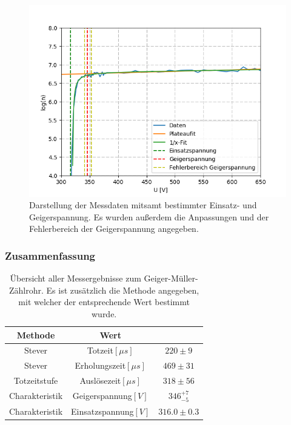 \documentclass[12pt,a4paper]{article}
\begin{document}
\begin{figure}
\centering
\includegraphics[scale=1]{Bilder/GMlog.PNG}
\caption{Darstellung der Messdaten mitsamt bestimmter Einsatz- und Geigerspannung. Es wurden außerdem die Anpassungen und der Fehlerbereich der Geigerspannung angegeben.}
\label{fig:GMCharakteristik}
\end{figure}

\subsubsection{Zusammenfassung}

\begin{table}
\center
\begin{tabular}{|c||c|c|}
\hline 
Methode & Wert &  \\ 
\hline 
Stever & Totzeit$[\mu s]$ & $220\pm 9$ \\ 
\hline 
Stever & Erholungszeit$[\mu s]$ & $469\pm 31$ \\ 
\hline 
Totzeitstufe & Auslösezeit$[\mu s]$ & $318\pm 56$ \\ 
\hline 
Charakteristik & Geigerspannung$[V]$ & $346_{-5}^{+7}$ \\ 
\hline 
Charakteristik & Einsatzspannung$[V]$ & $316.0\pm 0.3$\\ 
\hline 
\end{tabular} 
\caption{Übersicht aller Messergebnisse zum Geiger-Müller-Zählrohr. Es ist zusätzlich die Methode angegeben, mit welcher der entsprechende Wert bestimmt wurde.}
\label{GMzusammenfassung}
\end{table}
\end{document}
